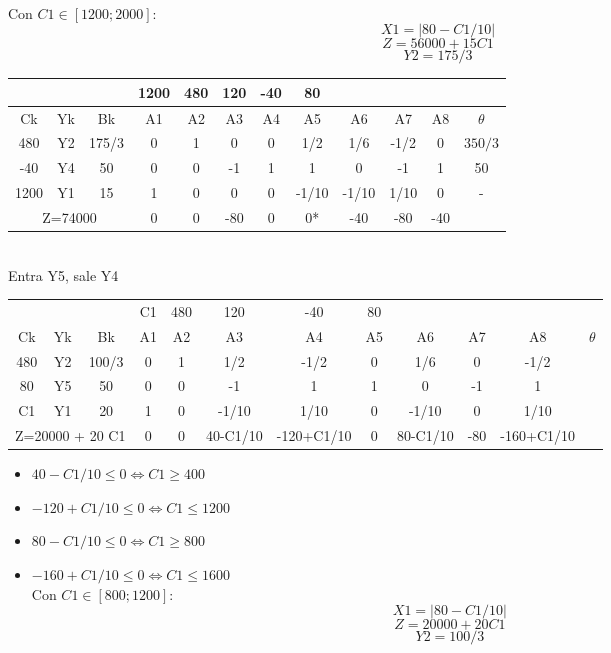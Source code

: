 \documentclass{article}
\begin{document}
\begin{enumerate}
\begin{itemize}
					\smallskip\\
					Con $C1 \in [1200; 2000]$:\\
					$$X1 = |80 - C1/10|$$
					$$Z = 56000 + 15 C1$$
					$$Y2 = 175/3$$
		\end{itemize}
		\begin{tabular}{|c  c  c | c  c  c  c  c  c  c  c | c |}
			\hline
			 \multicolumn{3}{|c|}{} & 1200 & 480 & 120 & -40 & 80 & & & &\\ \hline
			 Ck & Yk & Bk & A1 & A2 & A3 & A4 & A5 & A6 & A7 & A8 & $\theta$\\ \hline 
			 480 & Y2 & 175/3 & 0 & 1 & 0 & 0 & 1/2 & 1/6 & -1/2 & 0 & $350/3$\\
			 -40 & Y4 & 50 & 0 & 0 & -1 & 1 & 1 & 0 & -1 & 1 & 50\\
			 1200 & Y1 & 15 & 1 & 0 & 0 & 0 & -1/10 & -1/10 & 1/10 & 0 & -\\ \hline
			 \multicolumn{3}{|c|}{Z=74000} & 0 & 0 & -80 & 0 & 0* & -40 & -80 & -40 &\\ \hline
		\end{tabular}
		\medskip\\
		Entra Y5, sale Y4\\
		\begin{tabular}{|c  c  c | c  c  c  c  c  c  c  c | c |}
			\hline
			 \multicolumn{3}{|c|}{} & C1 & 480 & 120 & -40 & 80 & & & &\\ 
			 Ck & Yk & Bk & A1 & A2 & A3 & A4 & A5 & A6 & A7 & A8 & $\theta$\\ \hline 
			 480 & Y2 & 100/3 & 0 & 1 & 1/2 & -1/2 & 0 & 1/6 & 0 & -1/2 & \\
			 80 & Y5 & 50 & 0 & 0 & -1 & 1 & 1 & 0 & -1 & 1 & \\
			 C1 & Y1 & 20 & 1 & 0 & -1/10 & 1/10 & 0 & -1/10 & 0 & 1/10 & \\ \hline
			 \multicolumn{3}{|c|}{Z=20000 + 20 C1} & 0 & 0 & 40-C1/10 & -120+C1/10 & 0 & 80-C1/10 & -80 & -160+C1/10 &\\ \hline
		\end{tabular}
		\begin{itemize}
				\item $40 - C1/10 \leq 0 \iff C1 \geq 400$
				\item $-120 + C1/10 \leq 0 \iff C1 \leq 1200$
				\item $80 - C1/10 \leq 0 \iff C1 \geq 800$
				\item $-160 + C1/10 \leq 0 \iff C1 \leq 1600$
					\smallskip\\
					Con $C1 \in [800; 1200]$:\\
					$$X1 = |80 - C1/10|$$
					$$Z = 20000 + 20 C1$$
					$$Y2 = 100/3$$
		\end{itemize}


\end{enumerate}
\end{document}
